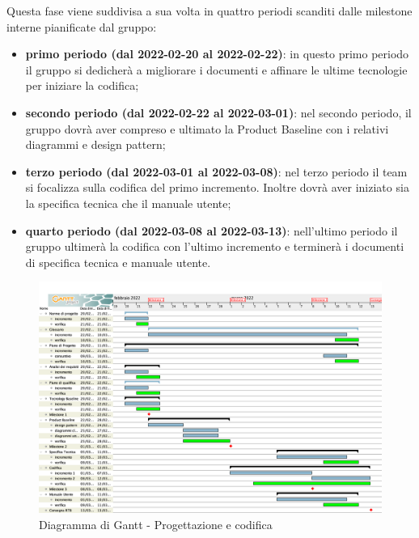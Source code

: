 Questa fase viene suddivisa a sua volta in quattro periodi scanditi dalle milestone interne pianificate dal gruppo:
\begin{itemize}
\item \textbf{primo periodo (dal 2022-02-20 al 2022-02-22)}: in questo primo periodo il gruppo si dedicherà a migliorare i documenti e affinare le ultime tecnologie per iniziare la codifica;
\item \textbf{secondo periodo (dal 2022-02-22 al 2022-03-01)}: nel secondo periodo,  il gruppo dovrà aver compreso e ultimato la Product Baseline con i relativi diagrammi e design pattern;
\item \textbf{terzo periodo (dal 2022-03-01 al 2022-03-08)}: nel terzo periodo il team si focalizza sulla codifica del primo incremento.  Inoltre dovrà aver iniziato sia la specifica tecnica che il manuale utente;
\item \textbf{quarto periodo (dal 2022-03-08 al 2022-03-13)}: nell'ultimo periodo il gruppo ultimerà la codifica con l’ultimo incremento e terminerà i documenti di specifica tecnica e manuale utente.
\end{itemize}

\begin{figure}[H]
\centering
\includegraphics[scale=0.35]{Sezioni/gantt/progettazione_codifica.png}
\caption{Diagramma di Gantt - Progettazione e codifica}
\end{figure}